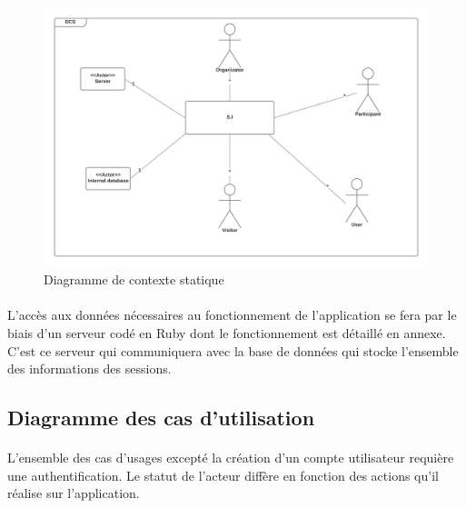 \documentclass[titlepage, 12pt]{report}
\begin{document}
\begin{figure}[!h]
	\caption{Diagramme de contexte statique}
	\label{statique_diagram}
	\centering
	\includegraphics[scale=0.2]{Images/diagram/static_diagram.png}
\end{figure}

\paragraph{}L'accès aux données nécessaires au fonctionnement de l'application se fera par le biais d'un serveur codé en Ruby dont le fonctionnement est détaillé en annexe. C'est ce serveur qui communiquera avec la base de données qui stocke l'ensemble des informations des sessions.

\subsection{Diagramme des cas d'utilisation}

\paragraph{}L'ensemble des cas d'usages excepté la création d'un compte utilisateur requière une authentification. Le statut de l'acteur diffère en fonction des actions qu'il réalise sur l'application. 
\end{document}
